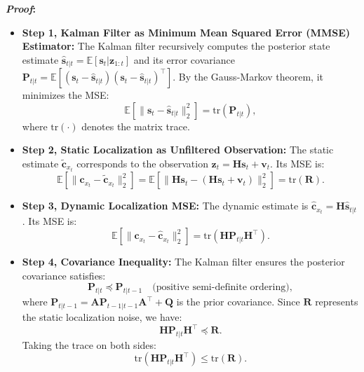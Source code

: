 \documentclass[journal,twoside,web]{ieeecolor}
\begin{document}
\textbf{\textit{Proof}:} 
 \begin{itemize}
     \item 
     \textbf{Step 1, Kalman Filter as Minimum Mean Squared Error (MMSE) Estimator:}  
	The Kalman filter recursively computes the posterior state estimate \(\hat{\mathbf{s}}_{t|t} = \mathbb{E}[\mathbf{s}_t | \mathbf{z}_{1:t}]\) and its error covariance \(\mathbf{P}_{t|t} = \mathbb{E}[(\mathbf{s}_t - \hat{\mathbf{s}}_{t|t})(\mathbf{s}_t - \hat{\mathbf{s}}_{t|t})^\top]\). By the Gauss-Markov theorem, it minimizes the MSE:  
	\begin{equation}   
	\mathbb{E}\left[ \| \mathbf{s}_t - \hat{\mathbf{s}}_{t|t} \|_2^2 \right] = \text{tr}(\mathbf{P}_{t|t}),  
	\end{equation} 
	where \(\text{tr}(\cdot)\) denotes the matrix trace.  
	\item 
    \textbf{Step 2, Static Localization as Unfiltered Observation:}  
	The static estimate \(\mathbf{\tilde c}_{x_t}\) corresponds to the observation \(\mathbf{z}_t = \mathbf{H} \mathbf{s}_t + \mathbf{v}_t\). Its MSE is:  
	\begin{equation}  
	\mathbb{E}\left[ \| \mathbf{c}_{x_t} - \mathbf{\tilde c}_{x_t} \|_2^2 \right] = \mathbb{E}\left[ \| \mathbf{H}\mathbf{s}_t - (\mathbf{H}\mathbf{s}_t + \mathbf{v}_t) \|_2^2 \right] = \text{tr}(\mathbf{R}).  
	\end{equation}   
    \item 
    \textbf{Step 3, Dynamic Localization MSE:} The dynamic estimate is \(\mathbf{\hat c}_{x_t} = \mathbf{H} \hat{\mathbf{s}}_{t|t}\). Its MSE is:
	\begin{equation} 
	\mathbb{E}\left[ \| \mathbf{c}_{x_t} - \mathbf{\hat c}_{x_t} \|_2^2 \right] = \text{tr}\left( \mathbf{H} \mathbf{P}_{t|t} \mathbf{H}^\top \right).  
	\end{equation} 
	 \item 
     \textbf{Step 4, Covariance Inequality:}  
	The Kalman filter ensures the posterior covariance satisfies:  
	\begin{equation}   
	\mathbf{P}_{t|t} \preceq \mathbf{P}_{t|t-1} \quad \text{(positive semi-definite ordering)},  
	\end{equation}  
	where \(\mathbf{P}_{t|t-1} = \mathbf{A} \mathbf{P}_{t-1|t-1} \mathbf{A}^\top + \mathbf{Q}\) is the prior covariance. Since \(\mathbf{R}\) represents the static localization noise, we have:  
	\begin{equation}  
	\mathbf{H} \mathbf{P}_{t|t} \mathbf{H}^\top \preceq \mathbf{R}.  
	\end{equation}   
	Taking the trace on both sides:  
	\begin{equation} 
	\text{tr}\left( \mathbf{H} \mathbf{P}_{t|t} \mathbf{H}^\top \right) \leq \text{tr}(\mathbf{R}).  
	\end{equation}   
 \end{itemize}
\end{document}
